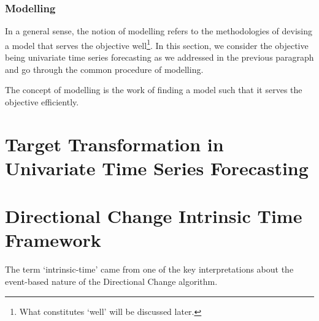 \subsubsection{Modelling}
In a general sense, the notion of modelling refers to the methodologies of devising a model that serves the objective well\footnote{What constitutes `well' will be discussed later.}. In this section, we consider the objective being univariate time series forecasting as we addressed in the previous paragraph and go through the common procedure of modelling.


The concept of modelling is the work of finding a model such that it serves the objective efficiently.


\section{Target Transformation in Univariate Time Series Forecasting}


\section{Directional Change Intrinsic Time Framework}





The term `intrinsic-time' came from one of the key interpretations about the event-based nature of the Directional Change algorithm.
